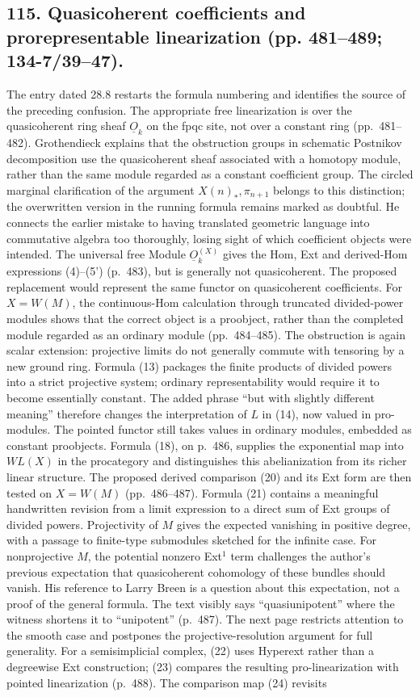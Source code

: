 \documentclass[10pt,oneside]{book}
\begin{document}
\subsection*{115. Quasicoherent coefficients and prorepresentable linearization (pp. 481--489; 134-7/39--47).}
The entry dated 28.8 restarts the formula numbering and identifies the source of the preceding confusion. The appropriate free linearization is over the quasicoherent ring sheaf $\underline O_k$ on the fpqc site, not over a constant ring (pp.~481--482). Grothendieck explains that the obstruction groups in schematic Postnikov decomposition use the quasicoherent sheaf associated with a homotopy module, rather than the same module regarded as a constant coefficient group. The circled marginal clarification of the argument $X(n)_*,\pi_{n+1}$ belongs to this distinction; the overwritten version in the running formula remains marked as doubtful. He connects the earlier mistake to having translated geometric language into commutative algebra too thoroughly, losing sight of which coefficient objects were intended. The universal free Module $\underline O_k^{(X)}$ gives the Hom, Ext and derived-Hom expressions (4)--(5') (p.~483), but is generally not quasicoherent. The proposed replacement would represent the same functor on quasicoherent coefficients. For $X=W(M)$, the continuous-Hom calculation through truncated divided-power modules shows that the correct object is a proobject, rather than the completed module regarded as an ordinary module (pp.~484--485). The obstruction is again scalar extension: projective limits do not generally commute with tensoring by a new ground ring. Formula (13) packages the finite products of divided powers into a strict projective system; ordinary representability would require it to become essentially constant. The added phrase ``but with slightly different meaning'' therefore changes the interpretation of $L$ in (14), now valued in pro-modules. The pointed functor still takes values in ordinary modules, embedded as constant proobjects. Formula (18), on p.~486, supplies the exponential map into $WL(X)$ in the procategory and distinguishes this abelianization from its richer linear structure. The proposed derived comparison (20) and its Ext form are then tested on $X=W(M)$ (pp.~486--487). Formula (21) contains a meaningful handwritten revision from a limit expression to a direct sum of Ext groups of divided powers. Projectivity of $M$ gives the expected vanishing in positive degree, with a passage to finite-type submodules sketched for the infinite case. For nonprojective $M$, the potential nonzero Ext$^1$ term challenges the author's previous expectation that quasicoherent cohomology of these bundles should vanish. His reference to Larry Breen is a question about this expectation, not a proof of the general formula. The text visibly says ``quasiunipotent'' where the witness shortens it to ``unipotent'' (p.~487). The next page restricts attention to the smooth case and postpones the projective-resolution argument for full generality. For a semisimplicial complex, (22) uses Hyperext rather than a degreewise Ext construction; (23) compares the resulting pro-linearization with pointed linearization (p.~488). The comparison map (24) revisits 
\end{document}
